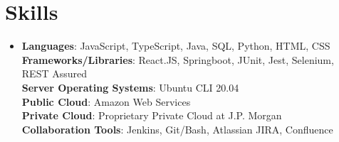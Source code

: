 \documentclass[letterpaper,11pt]{article}
\newcommand{\resumeSubHeadingListStart}{\begin{itemize}[leftmargin=*]}
\newcommand{\resumeSubHeadingListEnd}{\end{itemize}}
\begin{document}
        \section{Skills}
            \resumeSubHeadingListStart
            \item[]{
                \textbf{Languages}{: JavaScript, TypeScript, Java, SQL, Python, HTML, CSS}
                \hfill \\
                \textbf{Frameworks/Libraries}{: React.JS, Springboot, JUnit, Jest, Selenium, REST Assured} \\
                \textbf{Server Operating Systems}{: Ubuntu CLI 20.04} \\
                \textbf{Public Cloud}{: Amazon Web Services} \\
                \textbf{Private Cloud}{: Proprietary Private Cloud at J.P. Morgan} \\
                \textbf{Collaboration Tools}{: Jenkins, Git/Bash, Atlassian JIRA, Confluence} \\
            }
            \resumeSubHeadingListEnd
\end{document}
